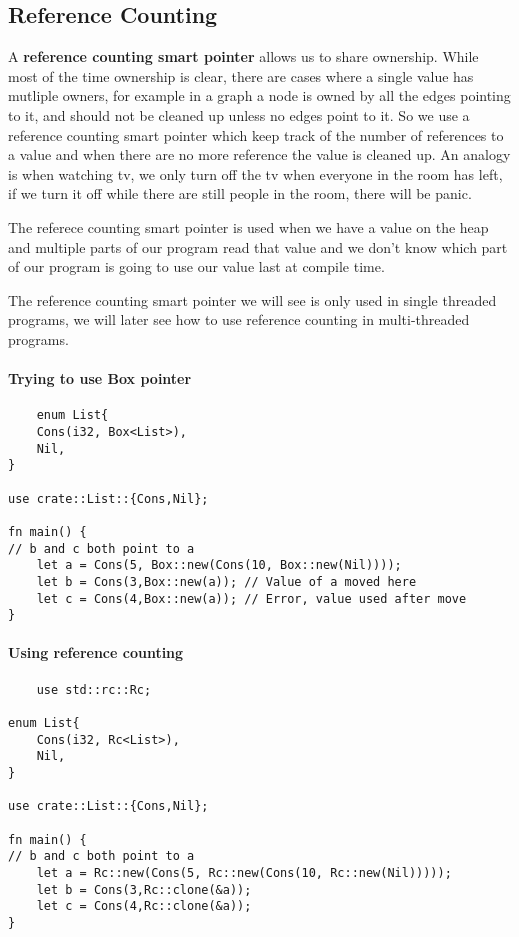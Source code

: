 \subsection{Reference Counting}
\begin{definition}
A \textbf{reference counting smart pointer} allows us to share ownership. While most of the time ownership is clear, there are cases where a single value has mutliple owners, for example in a graph a node is owned by all the edges pointing to it, and should not be cleaned up unless no edges point to it. So we use a reference counting smart pointer which keep track of the number of references to a value and when there are no more reference the value is cleaned up.
An analogy is when watching tv, we only turn off the tv when everyone in the room has left, if we turn it off while there are still people in the room, there will be panic.        
\end{definition}

The referece counting smart pointer is used when we have a value on the heap and multiple parts of our program read that value and we don't know which part of our program is going to use our value last at compile time.
\begin{remark}
The reference counting smart pointer we will see is only used in single threaded programs, we will later see how to use reference counting in multi-threaded programs.
\end{remark} 

\paragraph*{Trying to use Box pointer}\begin{lstlisting}
    enum List{
    Cons(i32, Box<List>),
    Nil,
}

use crate::List::{Cons,Nil};

fn main() {
// b and c both point to a
    let a = Cons(5, Box::new(Cons(10, Box::new(Nil))));
    let b = Cons(3,Box::new(a)); // Value of a moved here
    let c = Cons(4,Box::new(a)); // Error, value used after move
}
\end{lstlisting}
\paragraph*{Using reference counting}\begin{lstlisting}
    use std::rc::Rc;

enum List{
    Cons(i32, Rc<List>),
    Nil,
}

use crate::List::{Cons,Nil};

fn main() {
// b and c both point to a
    let a = Rc::new(Cons(5, Rc::new(Cons(10, Rc::new(Nil)))));
    let b = Cons(3,Rc::clone(&a)); 
    let c = Cons(4,Rc::clone(&a));
}
\end{lstlisting}

